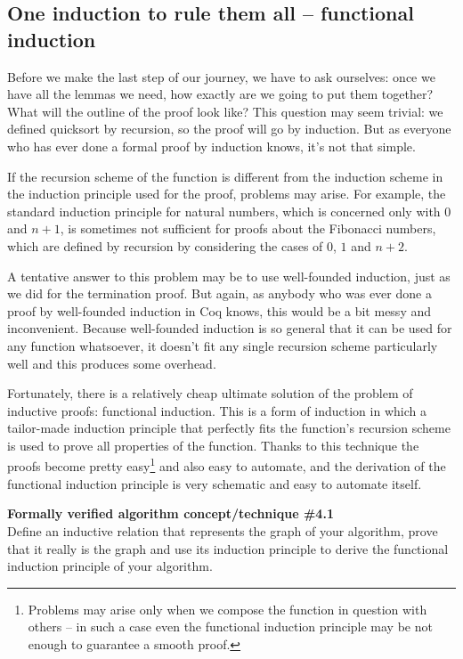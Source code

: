 \documentclass[declaration,mgr,english,shortabstract]{iithesis}
\begin{document}
\subsection{One induction to rule them all -- functional induction}

Before we make the last step of our journey, we have to ask ourselves: once we have all the lemmas we need, how exactly are we going to put them together? What will the outline of the proof look like? This question may seem trivial: we defined quicksort by recursion, so the proof will go by induction. But as everyone who has ever done a formal proof by induction knows, it's not that simple.

If the recursion scheme of the function is different from the induction scheme in the induction principle used for the proof, problems may arise. For example, the standard induction principle for natural numbers, which is concerned only with $0$ and $n + 1$, is sometimes not sufficient for proofs about the Fibonacci numbers, which are defined by recursion by considering the cases of $0$, $1$ and $n + 2$.

A tentative answer to this problem may be to use well-founded induction, just as we did for the termination proof. But again, as anybody who was ever done a proof by well-founded induction in Coq knows, this would be a bit messy and inconvenient. Because well-founded induction is so general that it can be used for any function whatsoever, it doesn't fit any single recursion scheme particularly well and this produces some overhead.

Fortunately, there is a relatively cheap ultimate solution of the problem of inductive proofs: functional induction. This is a form of induction in which a tailor-made induction principle that perfectly fits the function's recursion scheme is used to prove all properties of the function. Thanks to this technique the proofs become pretty easy\footnote{Problems may arise only when we compose the function in question with others -- in such a case even the functional induction principle may be not enough to guarantee a smooth proof.} and also easy to automate, and the derivation of the functional induction principle is very schematic and easy to automate itself.

\begin{center}
    \textbf{Formally verified algorithm concept/technique \#4.1} \\
    Define an inductive relation that represents the graph of your algorithm, prove that it really is the graph and use its induction principle to derive the functional induction principle of your algorithm.
\end{center}
\end{document}

